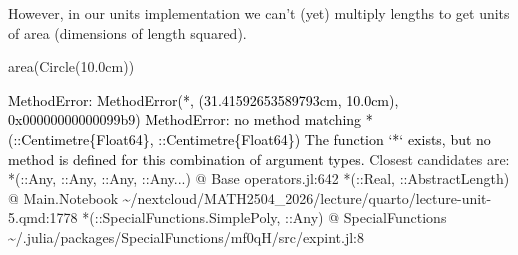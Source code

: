 \documentclass[
]{article}
\newenvironment{Shaded}{\begin{snugshade}}{\end{snugshade}}
\newcommand{\FloatTok}[1]{\textcolor[rgb]{0.68,0.00,0.00}{#1}}
\newcommand{\FunctionTok}[1]{\textcolor[rgb]{0.28,0.35,0.67}{#1}}
\newcommand{\NormalTok}[1]{\textcolor[rgb]{0.00,0.23,0.31}{#1}}
\begin{document}
However, in our units implementation we can't (yet) multiply lengths to
get units of area (dimensions of length squared).

\begin{Shaded}
\begin{Highlighting}[]
\FunctionTok{area}\NormalTok{(}\FunctionTok{Circle}\NormalTok{(}\FloatTok{10.0}\NormalTok{cm))}
\end{Highlighting}
\end{Shaded}

\begin{Highlighting}
\textcolor{black}{MethodError: MethodError(*, (31.41592653589793cm, 10.0cm), 0x00000000000099b9)}
\textcolor{black}{MethodError: no method matching *(::Centimetre\{Float64\}, ::Centimetre\{Float64\})}
\textcolor{black}{The function `*` exists, but no method is defined for this combination of argument types.}
\textcolor{black}{}\textcolor{QuartoInternalColor1}{Closest candidates are:}
\textcolor{QuartoInternalColor1}{}\textcolor{QuartoInternalColor1}{  *(::Any, ::Any, }\textcolor{QuartoInternalColor1}{::Any}\textcolor{QuartoInternalColor1}{, }\textcolor{QuartoInternalColor1}{::Any...}\textcolor{QuartoInternalColor1}{)}
\textcolor{QuartoInternalColor1}{}\textcolor{QuartoInternalColor1}{}\textcolor{QuartoInternalColor1}{   @}\textcolor{QuartoInternalColor1}{ }\textcolor{QuartoInternalColor1}{Base}\textcolor{QuartoInternalColor1}{ }\textcolor{QuartoInternalColor1}{}\textcolor{QuartoInternalColor1}{operators.jl:642}\textcolor{QuartoInternalColor1}{}\textcolor{QuartoInternalColor1}{}
\textcolor{QuartoInternalColor1}{}\textcolor{QuartoInternalColor1}{  *(}\textcolor{QuartoInternalColor1}{::Real}\textcolor{QuartoInternalColor1}{, ::AbstractLength)}
\textcolor{QuartoInternalColor1}{}\textcolor{QuartoInternalColor1}{}\textcolor{QuartoInternalColor1}{   @}\textcolor{QuartoInternalColor1}{ }\textcolor{QuartoInternalColor2}{Main.Notebook}\textcolor{QuartoInternalColor1}{ }\textcolor{QuartoInternalColor1}{\textasciitilde{}/nextcloud/MATH2504\_2026/lecture/quarto/}\textcolor{QuartoInternalColor1}{}\textcolor{QuartoInternalColor1}{}\textcolor{QuartoInternalColor1}{lecture-unit-5.qmd:1778}\textcolor{QuartoInternalColor1}{}\textcolor{QuartoInternalColor1}{}
\textcolor{QuartoInternalColor1}{}\textcolor{QuartoInternalColor1}{  *(}\textcolor{QuartoInternalColor1}{::SpecialFunctions.SimplePoly}\textcolor{QuartoInternalColor1}{, ::Any)}
\textcolor{QuartoInternalColor1}{}\textcolor{QuartoInternalColor1}{}\textcolor{QuartoInternalColor1}{   @}\textcolor{QuartoInternalColor1}{ }\textcolor{QuartoInternalColor3}{SpecialFunctions}\textcolor{QuartoInternalColor1}{ }\textcolor{QuartoInternalColor1}{\textasciitilde{}/.julia/packages/SpecialFunctions/mf0qH/src/}\textcolor{QuartoInternalColor1}{}\textcolor{QuartoInternalColor1}{}\textcolor{QuartoInternalColor1}{expint.jl:8}\textcolor{QuartoInternalColor1}{}\textcolor{QuartoInternalColor1}{}

\end{Highlighting}
\end{document}
